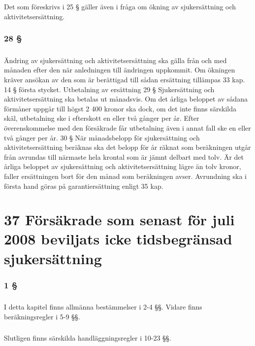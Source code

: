 \documentclass[a4paper,notitlepage,openany,10pt]{book}
\begin{document}
\paragraph*{}
Det som föreskrivs i 25 § gäller även i fråga om ökning av sjukersättning och aktivitetsersättning.
\subsection*{28 §}
\paragraph*{}
Ändring av sjukersättning och aktivitetsersättning ska gälla från och med månaden efter den när anledningen till ändringen uppkommit. Om ökningen kräver ansökan av den som är berättigad till sådan ersättning tillämpas 33 kap. 14 § första stycket.
Utbetalning av ersättning 29 § Sjukersättning och aktivitetsersättning ska betalas ut månadsvis. Om det årliga beloppet av sådana förmåner uppgår till högst 2 400 kronor ska dock, om det inte finns särskilda skäl, utbetalning ske i efterskott en eller två gånger per år. Efter överenskommelse med den försäkrade får utbetalning även i annat fall ske en eller två gånger per år. 30 § När månadsbelopp för sjukersättning och aktivitetsersättning beräknas ska det belopp för år räknat som beräkningen utgår från avrundas till närmaste hela krontal som är jämnt delbart med tolv. Är det årliga beloppet av sjukersättning och aktivitetsersättning lägre än tolv kronor, faller ersättningen bort för den månad som beräkningen avser. Avrundning ska i första hand göras på garantiersättning enligt 35 kap.
\chapter*{37 Försäkrade som senast för juli 2008 beviljats icke tidsbegränsad sjukersättning}
\subsection*{1 §}
\paragraph*{}
I detta kapitel finns allmänna bestämmelser i 2-4 §§.
Vidare finns beräkningsregler i 5-9 §§.
\paragraph*{}
Slutligen finns särskilda handläggningsregler i 10-23 §§.
\end{document}
